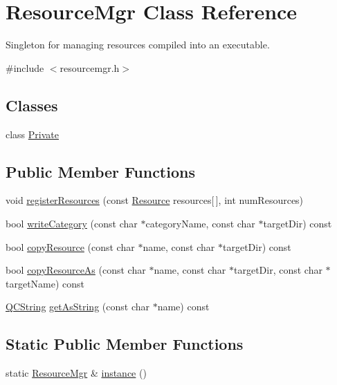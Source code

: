\hypertarget{class_resource_mgr}{}\section{Resource\+Mgr Class Reference}
\label{class_resource_mgr}


Singleton for managing resources compiled into an executable.  




{\ttfamily \#include $<$resourcemgr.\+h$>$}

\subsection*{Classes}
\begin{DoxyCompactItemize}
\item 
class \mbox{\hyperlink{class_resource_mgr_1_1_private}{Private}}
\end{DoxyCompactItemize}
\subsection*{Public Member Functions}
\begin{DoxyCompactItemize}
\item 
void \mbox{\hyperlink{class_resource_mgr_a2894f6f64a5376dfc475bde3f8acd0f3}{register\+Resources}} (const \mbox{\hyperlink{struct_resource}{Resource}} resources\mbox{[}$\,$\mbox{]}, int num\+Resources)
\item 
bool \mbox{\hyperlink{class_resource_mgr_a5596fb3e70044fa98520b4d95d5336e1}{write\+Category}} (const char $\ast$category\+Name, const char $\ast$target\+Dir) const
\item 
bool \mbox{\hyperlink{class_resource_mgr_add302925074918ff666629dcdd755f97}{copy\+Resource}} (const char $\ast$name, const char $\ast$target\+Dir) const
\item 
bool \mbox{\hyperlink{class_resource_mgr_ac6de7e012b820c139b1dc537987cab2c}{copy\+Resource\+As}} (const char $\ast$name, const char $\ast$target\+Dir, const char $\ast$target\+Name) const
\item 
\mbox{\hyperlink{class_q_c_string}{Q\+C\+String}} \mbox{\hyperlink{class_resource_mgr_a0feee9b73a63ad9b9e140624b42ccaee}{get\+As\+String}} (const char $\ast$name) const
\end{DoxyCompactItemize}
\subsection*{Static Public Member Functions}
\begin{DoxyCompactItemize}
\item 
static \mbox{\hyperlink{class_resource_mgr}{Resource\+Mgr}} \& \mbox{\hyperlink{class_resource_mgr_a02fb3176893696eaf659d680c8b08064}{instance}} ()
\end{DoxyCompactItemize}


